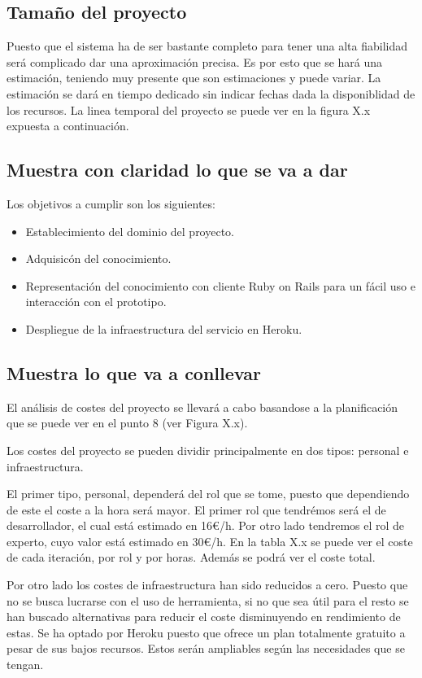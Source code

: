 \subsection{Tamaño del proyecto}
Puesto que el sistema ha de ser bastante completo para tener una alta fiabilidad
será complicado dar una aproximación precisa. Es por esto que se hará una estimación,
teniendo muy presente que son estimaciones y puede variar. La estimación se dará en
tiempo dedicado sin indicar fechas dada la disponiblidad de los recursos. La linea
temporal del proyecto se puede ver en la figura X.x expuesta a continuación.


\subsection{Muestra con claridad lo que se va a dar}
Los objetivos a cumplir son los siguientes:

\begin{itemize}
  \item Establecimiento del dominio del proyecto.
  \item Adquisicón del conocimiento.
  \item Representación del conocimiento con cliente Ruby on Rails para
    un fácil uso e interacción con el prototipo.
  \item Despliegue de la infraestructura del servicio en Heroku.
\end{itemize}

\subsection{Muestra lo que va a conllevar}
El análisis de costes del proyecto se llevará a cabo basandose a la planificación que se
puede ver en el punto 8 (ver Figura X.x).

Los costes del proyecto se pueden dividir principalmente en dos tipos: personal e infraestructura.

El primer tipo, personal, dependerá del rol que se tome, puesto que dependiendo de este
el coste a la hora será mayor. El primer rol que tendrémos será el de desarrollador, el
cual está estimado en 16€/h. Por otro lado tendremos el rol de experto, cuyo valor está estimado
en 30€/h. En la tabla X.x se puede ver el coste de cada iteración, por rol y por horas.
Además se podrá ver el coste total.

Por otro lado los costes de infraestructura han sido reducidos a cero. Puesto que no se
busca lucrarse con el uso de herramienta, si no que sea útil para el resto se han buscado
alternativas para reducir el coste disminuyendo en rendimiento de estas. Se ha optado
por Heroku puesto que ofrece un plan totalmente gratuito a pesar de sus bajos recursos.
Estos serán ampliables según las necesidades que se tengan.
